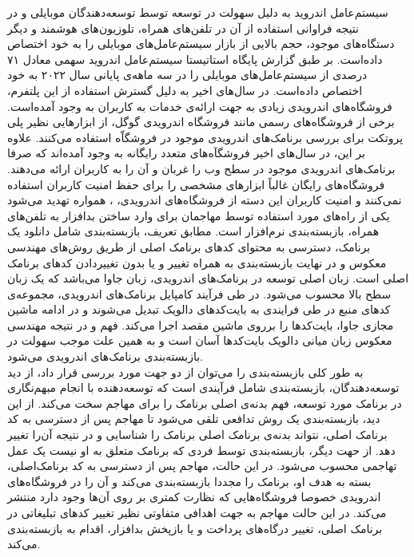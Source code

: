 
 سیستم‌عامل اندروید به دلیل سهولت در توسعه توسط توسعه‌دهندگان موبایلی و در نتیجه فراوانی استفاده از آن در تلفن‌های همراه، تلوزیون‌های هوشمند و دیگر دستگاه‌های موجود، حجم بالایی از بازار سیستم‌عامل‌های موبایلی را به خود اختصاص داده‌است. بر طبق گزارش پایگاه استاتیستا  سیستم‌عامل اندروید سهمی معادل ۷۱ درصدی از سیستم‌عامل‌های موبایلی را در سه‌ ماهه‌ی پایانی سال ۲۰۲۲ به خود اختصاص داده‌است. در سال‌های اخیر به دلیل گسترش استفاده از این پلتفرم، فروشگاه‌های اندرویدی زیادی به جهت ارائه‌ی خدمات به کاربران به وجود آمده‌است. برخی‌ از فروشگاه‌های رسمی مانند فروشگاه اندرویدی گوگل، از ابزار‌هایی نظیر پلی پروتکت برای بررسی برنامک‌های اندرویدی موجود در فروشگاّه‌ استفاده می‌کنند. علاوه بر این، در سال‌های اخیر فروشگآه‌های متعدد رایگانه به وجود آمده‌اند که صرفا برنامک‌های اندرویدی موجود در سطح وب را غربان و آن را به کاربران ارائه‌ می‌دهند. فروشگاه‌های رایگان غالباً ابزار‌های مشخصی را برای حفظ امنیت کاربران استفاده نمی‌کنند و امنیت کاربران این دسته از فروشگاه‌های اندرویدی،  ، همواره تهدید می‌شود یکی از راه‌های مورد استفاده توسط مهاجمان برای وارد ساختن بدافزار به تلفن‌های همراه، بازبسته‌بندی نرم‌افزار است. مطابق تعریف، بازبسته‌بندی شامل دانلود یک برنامک، دسترسی به محتوای کد‌های برنامک اصلی از طریق روش‌های مهندسی معکوس و در نهایت بازبسته‌بندی به همراه تغییر و یا بدون تغییر‌دادن کد‌های برنامک‌ اصلی است. زبان اصلی توسعه در برنامک‌های اندرویدی، زبان جاوا می‌باشد که یک زبان سطح بالا محسوب می‌شود. در طی فرآیند کامپایل برنامک‌های اندرویدی، مجموعه‌ی کد‌های منبع در طی فرایندی به بایت‌کد‌های دالویک تبدیل می‌شوند و در ادامه ماشین مجازی جاوا، بایت‌کد‌ها را برروی ماشین مقصد اجرا می‌کند. فهم و در نتیجه مهندسی معکوس زبان میانی دالویک بایت‌کد‌ها آسان است و به همین علت موجب سهولت در بازبسته‌بندی برنامک‌های اندرویدی می‌شود.\\
 به طور کلی بازبسته‌بندی را می‌توان از دو جهت مورد بررسی قرار داد، از دید توسعه‌دهندگان، بازبسته‌بندی شامل فرآیندی است که توسعه‌دهنده با انجام مبهم‌نگاری در برنامک مورد توسعه، فهم بدنه‌ی اصلی برنامک را برای مهاجم سخت می‌کند. از این دید، بازبسته‌بندی یک روش تدافعی تلقی می‌شود تا مهاجم پس از دسترسی به کد برنامک اصلی، نتواند بدنه‌ی برنامک اصلی برنامک را شناسایی و در نتیجه آن‌را تغییر دهد. از حهت دیگر، بازبسته‌بندی توسط فردی که برنامک متعلق به او نیست یک عمل تهاجمی محسوب می‌شود. در این حالت، مهاجم پس از دسترسی به کد برنامک‌اصلی، بسته به هدف او، برنامک‌ را مجددا بازبسته‌بندی می‌کند و آن را در فروشگاه‌های اندرویدی خصوصا فروشگاه‌هایی که نظارت کمتری بر روی آن‌ها وجود دارد منتشر می‌کند. در این حالت مهاجم به جهت اهدافی متفاوتی نظیر تغییر کد‌های تبلیغاتی در برنامک اصلی، تغییر درگاه‌های پرداخت و یا بازپخش بدافزار، اقدام به بازبسته‌بندی می‌کند.
